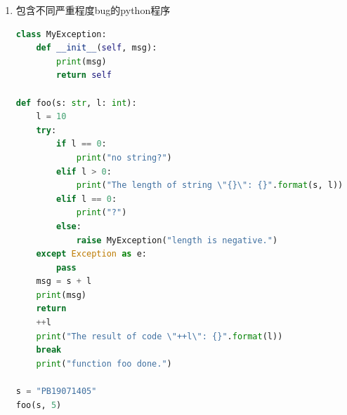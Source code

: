 \documentclass{article}
\begin{document}
\begin{enumerate}[label=\arabic*.]
        \item 包含不同严重程度bug的python程序 \\
        \begin{lstlisting}[language=python]
class MyException:
    def __init__(self, msg):
        print(msg)
        return self

def foo(s: str, l: int):
    l = 10
    try:
        if l == 0:
            print("no string?")
        elif l > 0:
            print("The length of string \"{}\": {}".format(s, l))
        elif l == 0:
            print("?")
        else:
            raise MyException("length is negative.")
    except Exception as e:
        pass
    msg = s + l
    print(msg)
    return
    ++l
    print("The result of code \"++l\": {}".format(l))
    break
    print("function foo done.")

s = "PB19071405"
foo(s, 5)


\end{lstlisting}
\end{enumerate}
\end{document}
